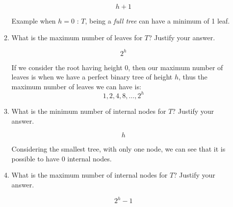 \documentclass[11pt]{article}
\begin{document}
\begin{enumerate}
\begin{enumerate}
        $$ h + 1 $$
        
        \vspace{0.5cm}
        Example when $h = 0$ : $T$, being a \emph{full tree} can have a minimum of 1 leaf.

        \begin{center}
        \end{center}
        \newpage

        \item What is the maximum number of leaves for $T$?  Justify your answer.

        $$ 2^h $$
        
        \vspace{0.5cm}
        If we consider the root having height 0, then our maximum number of leaves is when we have a perfect binary tree of height $h$, thus the maximum number of leaves we can have is:
        $$ 1, 2, 4, 8, \ldots, 2^h $$
        \vspace{.5cm}
        
        \item What is the minimum number of internal nodes for $T$?  Justify your answer.

        $$ h $$

        \vspace{0.5cm}
        Considering the smallest tree, with only one node, we can see that it is possible to have 0 internal nodes. 

        \begin{center}
        \end{center}
        \vspace{0.5cm}
        
        \item What is the maximum number of internal nodes for $T$?  Justify your answer.

        $$ 2^h - 1 $$
        

\end{enumerate}
\end{enumerate}
\end{document}

